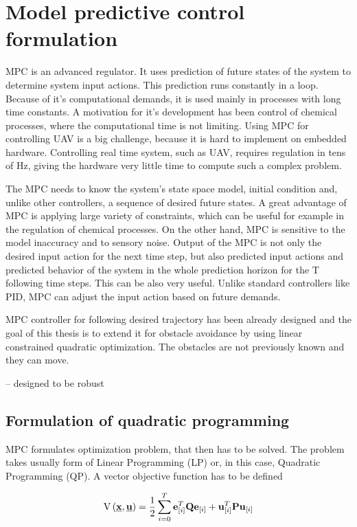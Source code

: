 \documentclass[a4paper,11pt,titlepage]{article}
\newcommand{\uvec}{\textbf{\underline{u}}}
\begin{document}
\section{Model predictive control formulation}


MPC is an advanced regulator. It uses prediction of future states of the system to determine system input actions. This prediction runs constantly in a loop. Because of it's computational demands, it is used mainly in processes with long time constants. A motivation for it's development has been control of chemical processes, where the computational time is not limiting. Using MPC for controlling UAV is a big challenge, because it is hard to implement on embedded hardware. Controlling real time system, such as UAV, requires regulation in tens of Hz, giving the hardware very little time to compute such a complex problem.

The MPC needs to know the system's state space model, initial condition and, unlike other controllers, a sequence of desired future states. A great advantage of MPC is applying large variety of constraints, which can be useful for example in the regulation of chemical processes. On the other hand, MPC is sensitive to the model inaccuracy and to sensory noise. Output of the MPC is not only the desired input action for the next time step, but also predicted input actions and predicted behavior of the system in the whole prediction horizon for the T following time steps. This can be also very useful. Unlike standard controllers like PID, MPC can adjust the input action based on future demands.

MPC controller for following desired trajectory has been already designed \cite{tom} and the goal of this thesis is to extend it for obstacle avoidance by using linear constrained quadratic optimization. The obstacles are not previously known and they can move. 

-- designed to be robust

\subsection{Formulation of quadratic programming}
MPC formulates optimization problem, that then has to be solved. The problem takes usually form of Linear Programming (LP) or, in this case, Quadratic Programming (QP). A vector objective function has to be defined

\begin{equation}
\label{eq:QP_formulation}
\begin{split}
\mathrm{V}\left(\textbf{\underline{x}}, \uvec\right) = \frac{1}{2}\sum_{i=0}^{T}\textbf{e}^T_{[i]}\textbf{Q}\textbf{e}_{[i]} + \textbf{u}^T_{[i]}\textbf{P}\textbf{u}_{[i]}
\end{split}
\end{equation}
\end{document}
